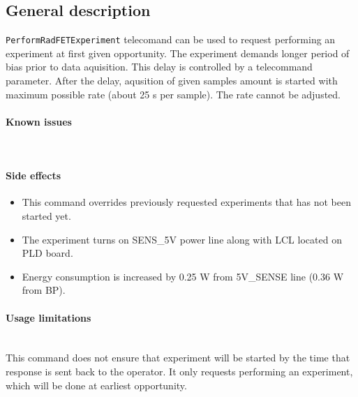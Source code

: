 

\subsection{General description}
\texttt{PerformRadFETExperiment} telecomand can be used to request performing an \radfet 
experiment at first given opportunity. The experiment demands longer period of bias prior to data aquisition. 
This delay is controlled by a telecommand parameter. After the delay, aqusition of given samples amount is started 
with maximum possible rate (about 25 s per sample). The rate cannot be adjusted.



\paragraph{Known issues} \mbox{} \\
\None

\paragraph{Side effects} \mbox{}
\begin{itemize}
    \item This command overrides previously requested experiments that has not been started yet. 
    \item The experiment turns on SENS_5V power line along with \radfet LCL located on PLD board.
    \item Energy consumption is increased by 0.25 W from 5V_SENSE line (0.36 W from BP).
\end{itemize}


\paragraph{Usage limitations} \mbox{} \\
This command does not ensure that \radfet experiment will be started by the time that 
response is sent back to the operator. It only requests performing an experiment, which 
will be done at earliest opportunity.

